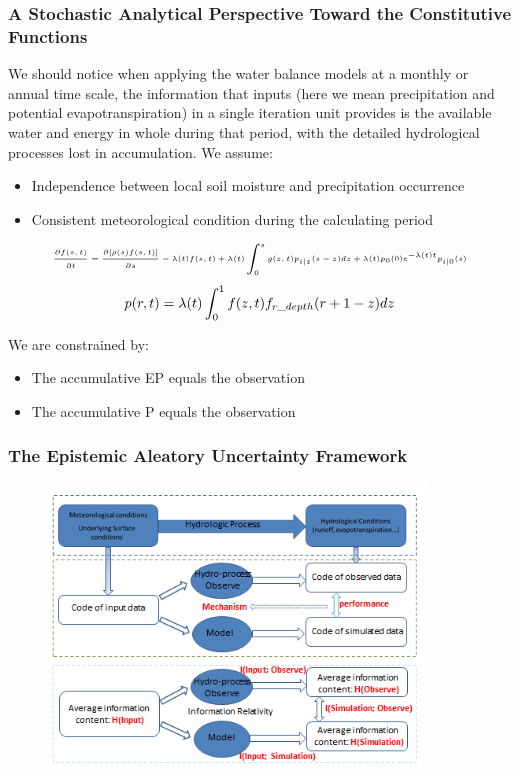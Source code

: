 \documentclass{beamer}
\begin{document}
\begin{frame}
\frametitle{A Stochastic Analytical Perspective Toward the Constitutive Functions}
We should notice when applying the water balance models at a monthly or annual  time scale, the information that inputs (here we mean precipitation and potential evapotranspiration) in a single iteration unit provides is the available water and energy in whole during that period, with the detailed hydrological processes lost in accumulation. 
We assume:
\begin{itemize}
\item Independence between local soil moisture and precipitation occurrence
\item Consistent meteorological condition during the calculating period
\end{itemize}  
\end{frame}

\begin{frame}
\begin{equation}\tiny
 \begin{split}
 \frac{\partial{f(s,t)}}{\partial t}=\frac{\partial{[\rho(s)f(s,t)]}}{\partial s}-\lambda(t)f(s,t)+\lambda(t)\int_{0}^{s} g(z,t)p_{i|z}(s-z)dz+\lambda(t)p_0(0)e^{-\lambda(t) t}p_{i|0}(s)
 \end{split}
 \end{equation}
 \begin{equation}\tiny
 p(r,t)=\lambda(t)\int_{0}^{1} f(z,t)f_{r\_depth}(r+1-z)dz
 \end{equation} 
 
 
 We are constrained by:
\begin{itemize}
\item The accumulative EP equals the observation
\item The accumulative P equals the observation
\end{itemize}
\end{frame}

\begin{frame}
\frametitle{The Epistemic  Aleatory Uncertainty Framework}
\begin{figure}[htbp]
\centering
\includegraphics[width=10cm]{3.png}
\end{figure}
\end{frame}
\end{document}
